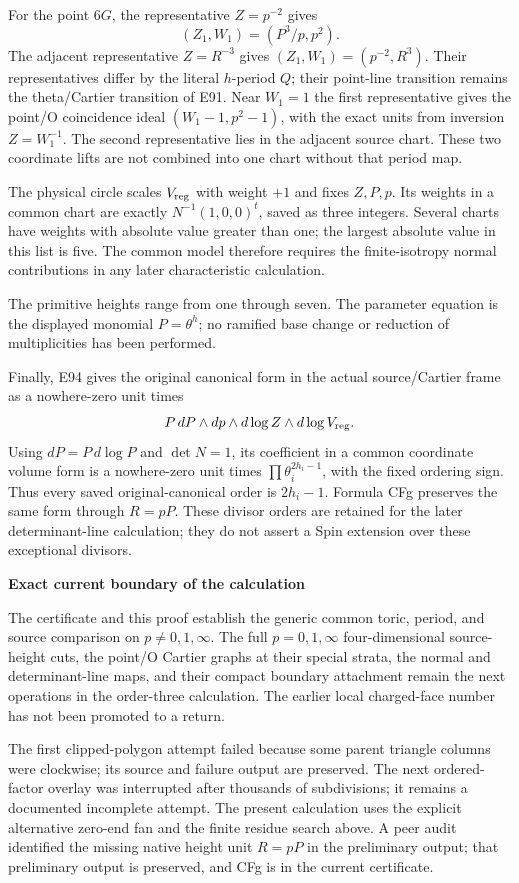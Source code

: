 For the point \(6G\), the representative \(Z=p^{-2}\) gives
\[
 (Z_1,W_1)=(P^3/p,p^2).
\]
The adjacent representative \(Z=R^{-3}\) gives
\((Z_1,W_1)=(p^{-2},R^3)\). Their representatives differ by the literal \(h\)-period \(Q\); their point-line transition remains the theta/Cartier transition of E91. Near \(W_1=1\) the first representative gives the point/O coincidence ideal
\((W_1-1,p^2-1)\), with the exact units from inversion \(Z=W_1^{-1}\).
The second representative lies in the adjacent source chart. These two coordinate lifts are not combined into one chart without that period map.

The physical circle scales \(V_{\rm reg}\) with weight \(+1\) and fixes \(Z,P,p\). Its weights in a common chart are exactly
\(N^{-1}(1,0,0)^t\), saved as three integers. Several charts have weights with absolute value greater than one; the largest absolute value in this list is five. The common model therefore requires the finite-isotropy normal contributions in any later characteristic calculation.

The primitive heights range from one through seven. The parameter equation is the displayed monomial \(P=\theta^h\); no ramified base change or reduction of multiplicities has been performed.

Finally, E94 gives the original canonical form in the actual source/Cartier frame as a nowhere-zero unit times
\[
 P\,dP\wedge dp\wedge d\log Z\wedge d\log V_{\rm reg}.
\]
Using \(dP=P\,d\log P\) and \(\det N=1\), its coefficient in a common coordinate volume form is a nowhere-zero unit times
\(\prod\theta_i^{2h_i-1}\), with the fixed ordering sign. Thus every saved original-canonical order is \(2h_i-1\). Formula CFg preserves the same form through \(R=pP\). These divisor orders are retained for the later determinant-line calculation; they do not assert a Spin extension over these exceptional divisors.

\par

\medskip\noindent\textbf{Exact current boundary of the calculation}

\par\nobreak

The certificate and this proof establish the generic common toric, period, and source comparison on \(p\ne0,1,\infty\). The full \(p=0,1,\infty\) four-dimensional source-height cuts, the point/O Cartier graphs at their special strata, the normal and determinant-line maps, and their compact boundary attachment remain the next operations in the order-three calculation. The earlier local charged-face number has not been promoted to a return.

The first clipped-polygon attempt failed because some parent triangle columns were clockwise; its source and failure output are preserved. The next ordered-factor overlay was interrupted after thousands of subdivisions; it remains a documented incomplete attempt. The present calculation uses the explicit alternative zero-end fan and the finite residue search above. A peer audit identified the missing native height unit \(R=pP\) in the preliminary output; that preliminary output is preserved, and CFg is in the current certificate.

